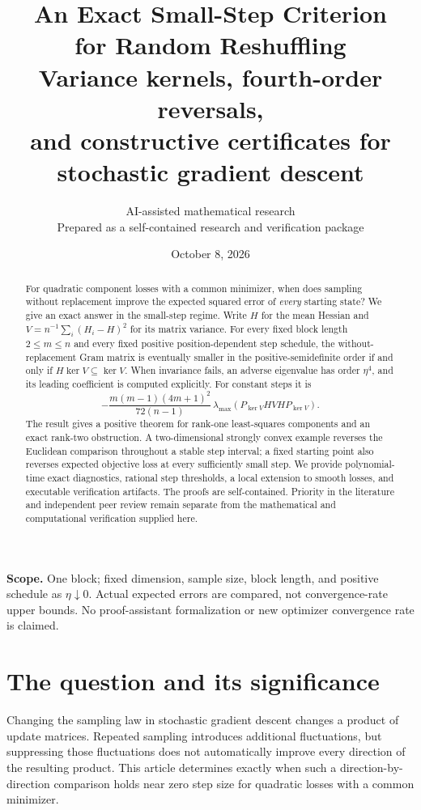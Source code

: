 \documentclass[11pt,letterpaper]{article}
\title{\vspace{-1.0cm}\textbf{An Exact Small-Step Criterion\\for Random Reshuffling}\\[0.45em]
\large Variance kernels, fourth-order reversals,\\and constructive certificates for stochastic gradient descent}
\author{AI-assisted mathematical research\\\small Prepared as a self-contained research and verification package}
\date{October 8, 2026}
\numberwithin{equation}{section}
\theoremstyle{definition}
\begin{document}
\maketitle
\thispagestyle{empty}
\begin{abstract}
For quadratic component losses with a common minimizer, when does sampling without replacement improve the expected squared error of \emph{every} starting state? We give an exact answer in the small-step regime. Write $H$ for the mean Hessian and $V=n^{-1}\sum_i(H_i-H)^2$ for its matrix variance. For every fixed block length $2\le m\le n$ and every fixed positive position-dependent step schedule, the without-replacement Gram matrix is eventually smaller in the positive-semidefinite order if and only if $H\ker V\subseteq\ker V$. When invariance fails, an adverse eigenvalue has order $\eta^4$, and its leading coefficient is computed explicitly. For constant steps it is
\[
 -\frac{m(m-1)(4m+1)^2}{72(n-1)}\,
 \lambda_{\max}\!\left(P_{\ker V}HVHP_{\ker V}\right).
\]
The result gives a positive theorem for rank-one least-squares components and an exact rank-two obstruction. A two-dimensional strongly convex example reverses the Euclidean comparison throughout a stable step interval; a fixed starting point also reverses expected objective loss at every sufficiently small step. We provide polynomial-time exact diagnostics, rational step thresholds, a local extension to smooth losses, and executable verification artifacts. The proofs are self-contained. Priority in the literature and independent peer review remain separate from the mathematical and computational verification supplied here.
\end{abstract}
\vfill
\noindent\textbf{Scope.} One block; fixed dimension, sample size, block length, and positive schedule as $\eta\downarrow0$. Actual expected errors are compared, not convergence-rate upper bounds. No proof-assistant formalization or new optimizer convergence rate is claimed.
\newpage
\begingroup
\small
\setlength{\parskip}{0pt}
\tableofcontents
\endgroup
\newpage

\section{The question and its significance}

Changing the sampling law in stochastic gradient descent changes a product of update matrices. Repeated sampling introduces additional fluctuations, but suppressing those fluctuations does not automatically improve every direction of the resulting product. This article determines exactly when such a direction-by-direction comparison holds near zero step size for quadratic losses with a common minimizer.
\end{document}
